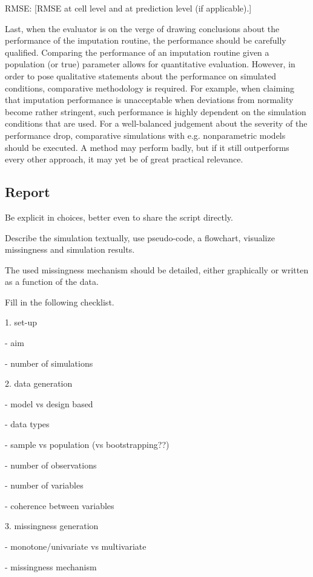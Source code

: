 \documentclass[bimj,fleqn]{w-art}
\theoremstyle{plain}
\theoremstyle{definition}
\begin{document}
RMSE: [RMSE at cell level and at prediction level (if applicable).]

Last, when the evaluator is on the verge of drawing conclusions about the performance of the imputation routine, the performance should be carefully qualified. Comparing the performance of an imputation routine given a population (or true) parameter allows for quantitative evaluation. However, in order to pose qualitative statements about the performance on simulated conditions, comparative methodology is required. For example, when claiming that imputation performance is unacceptable when deviations from normality become rather stringent, such performance is highly dependent on the simulation conditions that are used. For a well-balanced judgement about the severity of the performance drop, comparative simulations with e.g. nonparametric models should be executed. A method may perform badly, but if it still outperforms every other approach, it may yet be of great practical relevance.



\subsection{Report}

Be explicit in choices, better even to share the script directly. 

Describe the simulation textually, use pseudo-code, a flowchart, visualize missingness and simulation results.

The used missingness mechanism should be detailed, either graphically or written as a function of the data. 


Fill in the following checklist.

1. set-up

- aim

- number of simulations

2. data generation

- model vs design based

- data types

- sample vs population (vs bootstrapping??)

- number of observations

- number of variables

- coherence between variables


3. missingness generation

- monotone/univariate vs multivariate

- missingness mechanism
\end{document}
